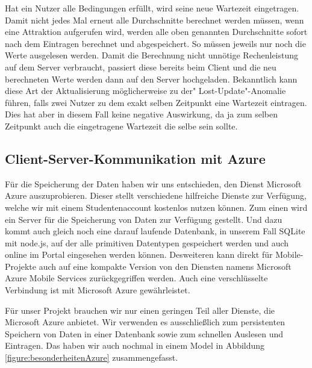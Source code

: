 Hat ein Nutzer alle Bedingungen erfüllt, wird seine neue Wartezeit eingetragen. Damit nicht jedes Mal erneut alle Durchschnitte berechnet werden müssen, wenn eine Attraktion aufgerufen wird, werden alle oben genannten Durchschnitte sofort nach dem Eintragen berechnet und abgespeichert. So müssen jeweils nur noch die Werte ausgelesen werden. Damit die Berechnung nicht unnötige Rechenleistung auf dem Server verbraucht, passiert diese bereits beim Client und die neu berechneten Werte werden dann auf den Server hochgeladen. Bekanntlich kann diese Art der Aktualisierung möglicherweise zu der" Lost-Update"{}-Anomalie führen, falls zwei Nutzer zu dem exakt selben Zeitpunkt eine Wartezeit eintragen. Dies hat aber in diesem Fall keine negative Auswirkung, da ja zum selben Zeitpunkt auch die eingetragene Wartezeit die selbe sein sollte.

\subsection{Client-Server-Kommunikation mit Azure}
\label{sec:implementierung:besonderheiten:azure}

Für die Speicherung der Daten haben wir uns entschieden, den Dienst Microsoft Azure auszuprobieren. Dieser stellt verschiedene hilfreiche Dienste zur Verfügung, welche wir mit einem Studentenaccount kostenlos nutzen können. Zum einen wird ein Server für die Speicherung von Daten zur Verfügung gestellt. Und dazu kommt auch gleich noch eine darauf laufende Datenbank, in unserem Fall SQLite mit node.js, auf der alle primitiven Datentypen gespeichert werden und auch online im Portal eingesehen werden können. Desweiteren kann direkt für Mobile-Projekte auch auf eine kompakte Version von den Diensten namens Microsoft Azure Mobile Services zurückgegriffen werden. Auch eine verschlüsselte Verbindung ist mit Microsoft Azure gewährleistet.

Für unser Projekt brauchen wir nur einen geringen Teil aller Dienste, die Microsoft Azure anbietet. Wir verwenden es ausschließlich zum persistenten Speichern von Daten in einer Datenbank sowie zum schnellen Auslesen und Eintragen. Das haben wir auch nochmal in einem Model in Abbildung \ref{figure:besonderheitenAzure} zusammengefasst.

